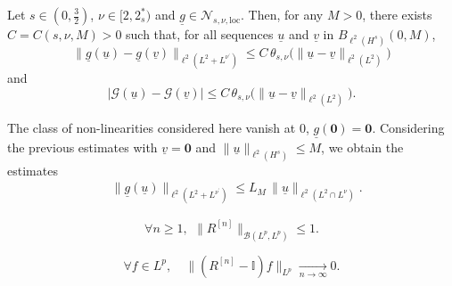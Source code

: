\documentclass[10pt,a4paper]{amsart}
\newcommand{\Clip}[1]{L_{#1}}
\newcommand{\Nlocnu}{\mathscr{N}_{s,\nu,\mathrm{loc}}}
\newcommand{\thetasnu}{\theta_{s,\nu}}
\newcommand{\twoasts}{{2^*_s}}
\newcommand{\ulg}{\underline{g}}
\newcommand{\ulu}{\underline{u}}
\newcommand{\ulv}{\underline{v}}
\newcommand{\ulzero}{\boldsymbol{0}}
\begin{document}
	\begin{lemma}\label{lem:hoelder-regularity-non-linearity}Let $s\in(0,\frac32)$, $\nu\in[2,\twoasts)$ and $\ulg\in\Nlocnu$. 
		Then, for any $M>0$, there exists~$C=C(s,\nu,M)>0$
		such that, for all sequences $ \ulu$ and $\ulv$ in $B_{\ell^2(H^{s})}(0,M)$,
		\begin{equation}\label{est:Lnu_L2_norms}
			\| \ulg (\ulu) -\ulg (\ulv) \|_{\ell^2(L^2+L^{\nu^\prime})} \leq C \, \thetasnu \big(\| \ulu-\ulv \|_{\ell^2(L^2)}\big)
		\end{equation}
		and
		\begin{equation}\label{est:nonlinear_energy_L2}
			| \mathscr{G}(\ulu) - \mathscr{G}(\ulv) | \leq C \, \thetasnu \big(\| \ulu-\ulv \|_{\ell^2(L^2)}\big) .
		\end{equation}
	\end{lemma}

	\begin{remark}%
		The class of non-linearities considered here vanish at $0$, $\ulg(\ulzero) = \ulzero $. Considering the previous estimates with $ \ulv = \ulzero $ and $ \|\ulu\|_{\ell^2(H^s)}\leq M $, we obtain the estimates
		\begin{align}
			\label{est:single_nonlinearity_Lp}
			& \| \ulg (\ulu)  \|_{\ell^2(L^2+L^{\nu^\prime})} \leq \Clip{M} \, \| \ulu \|_{\ell^2(L^2\cap L^\nu)}. 
		\end{align}
	\end{remark}

		\begin{equation}
			\label{est:reg_Lp_simple}
			\forall n \geq 1, \,\ \| R^{[n]} \|_{\mathcal{B}(L^p,L^p)} \leq 1 .
		\end{equation}

		\begin{equation}
			\label{lim:reg_strong_conv_simple}
			\forall f \in L^p, \quad \| (R^{[n]} - \mathbb{I} ) f \|_{L^p} \xrightarrow[n \rightarrow \infty]{} 0 .
		\end{equation}
\end{document}
